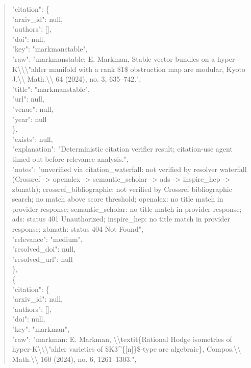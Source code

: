 \documentclass[11pt]{article}
\begin{document}
\begin{quote}
      "citation": \{\\
        "arxiv\_id": null,\\
        "authors": [],\\
        "doi": null,\\
        "key": "markmanstable",\\
        "raw": "markmanstable: E. Markman, Stable vector bundles on a hyper-K\textbackslash{}\textbackslash{}\textbackslash{}"ahler manifold with a rank \$1\$ obstruction map are modular, Kyoto J.\textbackslash{}\textbackslash{} Math.\textbackslash{}\textbackslash{} 64 (2024), no. 3, 635--742.",\\
        "title": "markmanstable",\\
        "url": null,\\
        "venue": null,\\
        "year": null\\
      \},\\
      "exists": null,\\
      "explanation": "Deterministic citation verifier result; citation-use agent timed out before relevance analysis.",\\
      "notes": "unverified via citation\_waterfall: not verified by resolver waterfall (Crossref -> openalex -> semantic\_scholar -> ads -> inspire\_hep -> zbmath); crossref\_bibliographic: not verified by Crossref bibliographic search; no match above score threshold; openalex: no title match in provider response; semantic\_scholar: no title match in provider response; ads: status 401 Unauthorized; inspire\_hep: no title match in provider response; zbmath: status 404 Not Found",\\
      "relevance": "medium",\\
      "resolved\_doi": null,\\
      "resolved\_url": null\\
    \},\\
    \{\\
      "citation": \{\\
        "arxiv\_id": null,\\
        "authors": [],\\
        "doi": null,\\
        "key": "markman",\\
        "raw": "markman: E. Markman, \textbackslash{}\textbackslash{}textit\{Rational Hodge isometries of hyper-K\textbackslash{}\textbackslash{}\textbackslash{}"ahler varieties of \$K3\^{}\{[n]\}\$-type are algebraic\}, Compos.\textbackslash{}\textbackslash{} Math.\textbackslash{}\textbackslash{} 160 (2024), no. 6, 1261--1303.",\\

\end{quote}
\end{document}
